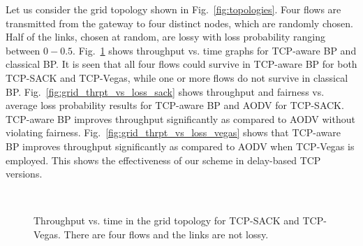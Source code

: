 \documentclass[conference]{IEEEtran}
\begin{document}
Let us consider the grid topology shown in Fig.~\ref{fig:topologies}. Four flows are transmitted from the gateway to four distinct nodes, which are randomly chosen. Half of the links, chosen at random, are lossy with loss probability ranging between $0-0.5$. Fig.~\ref{fig:grid_thrpt_time_results} shows throughput vs. time graphs for TCP-aware BP and classical BP. It is seen that all four flows could survive in TCP-aware BP for both TCP-SACK and TCP-Vegas, while one or more flows do not survive in classical BP. Fig.~\ref{fig:grid_thrpt_vs_loss_sack} shows throughput and fairness vs. average loss probability results for TCP-aware BP and AODV for TCP-SACK. TCP-aware BP improves throughput significantly as compared to AODV without violating fairness. Fig.~\ref{fig:grid_thrpt_vs_loss_vegas} shows that TCP-aware BP improves throughput significantly as compared to AODV when TCP-Vegas is employed. This shows the effectiveness of our scheme in delay-based TCP versions.



\begin{figure}[t!]
\vspace{-0pt}
\begin{center}
 \hspace{-0pt} \\
 \hspace{-0pt}
\end{center}
\begin{center}
\vspace{-15pt}
\caption{\label{fig:grid_thrpt_time_results} \scriptsize Throughput vs. time in the grid topology for TCP-SACK and TCP-Vegas. There are four flows and the links are not lossy.
}
\end{center}
\vspace{-15pt}
\end{figure}
\end{document}
